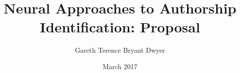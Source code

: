 \documentclass[12pt] {newrucsthesis}    %
\begin{document}



\title{ Neural Approaches to Authorship Identification: Proposal }
\author{ Gareth Terence Bryant Dwyer}
\date { March 2017 }
\maketitle  




 
\end{document}
